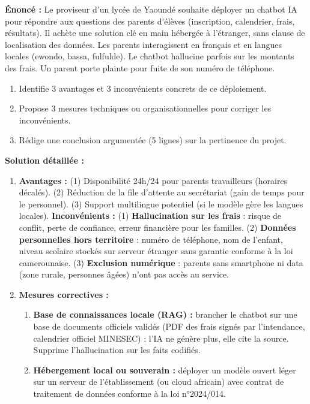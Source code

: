 \documentclass[11pt]{article}
\begin{document}
\begin{exoresolu}
\textbf{Énoncé :} Le proviseur d'un lycée de Yaoundé souhaite déployer un chatbot IA pour répondre aux questions des parents d'élèves (inscription, calendrier, frais, résultats). Il achète une solution clé en main hébergée à l'étranger, sans clause de localisation des données. Les parents interagissent en français et en langues locales (ewondo, bassa, fulfulde). Le chatbot hallucine parfois sur les montants des frais. Un parent porte plainte pour fuite de son numéro de téléphone.
\begin{enumerate}
    \item Identifie 3 avantages et 3 inconvénients concrets de ce déploiement.
    \item Propose 3 mesures techniques ou organisationnelles pour corriger les inconvénients.
    \item Rédige une conclusion argumentée (5 lignes) sur la pertinence du projet.
\end{enumerate}
\tcblower
\textbf{Solution détaillée :}
\begin{enumerate}
    \item \textbf{Avantages :} (1) Disponibilité 24h/24 pour parents travailleurs (horaires décalés). (2) Réduction de la file d'attente au secrétariat (gain de temps pour le personnel). (3) Support multilingue potentiel (si le modèle gère les langues locales).
    \textbf{Inconvénients :} (1) \textbf{Hallucination sur les frais} : risque de conflit, perte de confiance, erreur financière pour les familles. (2) \textbf{Données personnelles hors territoire} : numéro de téléphone, nom de l'enfant, niveau scolaire stockés sur serveur étranger sans garantie conforme à la loi camerounaise. (3) \textbf{Exclusion numérique} : parents sans smartphone ni data (zone rurale, personnes âgées) n'ont pas accès au service.
    \item \textbf{Mesures correctives :}
    \begin{enumerate}
        \item \textbf{Base de connaissances locale (RAG) :} brancher le chatbot sur une base de documents officiels validés (PDF des frais signés par l'intendance, calendrier officiel MINESEC) : l'IA ne génère plus, elle cite la source. Supprime l'hallucination sur les faits codifiés.
        \item \textbf{Hébergement local ou souverain :} déployer un modèle ouvert léger sur un serveur de l'établissement (ou cloud africain) avec contrat de traitement de données conforme à la loi n°2024/014.

\end{enumerate}
\end{enumerate}
\end{exoresolu}
\end{document}
